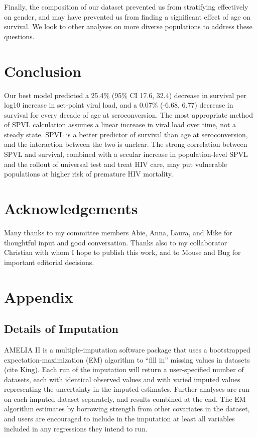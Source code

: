 \documentclass[12pt, titlepage, proquest]{article}
\begin{document}
Finally, the composition of our dataset prevented us from stratifying effectively on gender, and may have prevented us from finding a significant effect of age on survival. We look to other analyses on more diverse populations to address these questions. 

\section{Conclusion}

Our best model predicted a 25.4\% (95\% CI 17.6, 32.4) decrease in survival per log10 increase in set-point viral load, and a 0.07\% (-6.68, 6.77) decrease in survival for every decade of age at seroconversion. The most appropriate method of SPVL calculation assumes a linear increase in viral load over time, not a steady state. SPVL is a better predictor of survival than age at seroconversion, and the interaction between the two is unclear. The strong correlation between SPVL and survival, combined with a secular increase in population-level SPVL and the rollout of universal test and treat HIV care, may put vulnerable populations at higher risk of premature HIV mortality. 

\section{Acknowledgements}

Many thanks to my committee members Abie, Anna, Laura, and Mike for thoughtful input and good conversation. Thanks also to my collaborator Christian with whom I hope to publish this work, and to Mouse and Bug for important editorial decisions.

\section{Appendix}

\subsection{Details of Imputation}

AMELIA II is a multiple-imputation software package that uses a bootstrapped expectation-maximization (EM) algorithm to ``fill in'' missing values in datasets (cite King). Each run of the imputation will return a user-specified number of datasets, each with identical observed values and with varied imputed values representing the uncertainty in the imputed estimates. Further analyses are run on each imputed dataset separately, and results combined at the end. The EM algorithm estimates by borrowing strength from other covariates in the dataset, and users are encouraged to include in the imputation at least all variables included in any regressions they intend to run.
\end{document}
